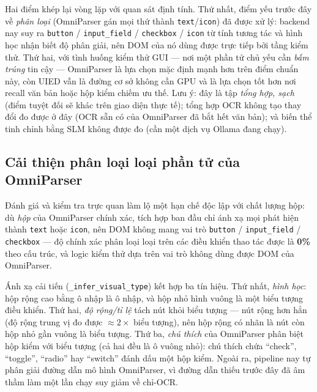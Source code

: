 \documentclass[11pt,a4paper]{article}
\newcommand{\code}[1]{\texttt{#1}}
\begin{document}
Hai điểm khép lại vòng lặp với quan sát định tính. Thứ nhất, điểm yếu trước đây về
\emph{phân loại} (OmniParser gán mọi thứ thành \code{text}/\code{icon}) đã được xử lý:
backend nay suy ra \code{button} / \code{input\_field} / \code{checkbox} /
\code{icon} từ tính tương tác và hình học nhận biết độ phân giải, nên DOM của nó dùng
được trực tiếp bởi tầng kiểm thử. Thứ hai, với tình huống kiểm thử GUI --- nơi một
phần tử chủ yếu cần \emph{bấm trúng} tin cậy --- OmniParser là lựa chọn mặc định mạnh
hơn trên điểm chuẩn này, còn UIED vẫn là đường cơ sở không cần GPU và là lựa chọn tốt
hơn nơi recall văn bản hoặc hộp kiểm chiếm ưu thế. Lưu ý: đây là tập \emph{tổng hợp,
sạch} (điểm tuyệt đối sẽ khác trên giao diện thực tế); tổng hợp OCR không tạo thay đổi
đo được ở đây (OCR sẵn có của OmniParser đã bắt hết văn bản); và biến thể tinh chỉnh
bằng SLM không được đo (cần một dịch vụ Ollama đang chạy).

\subsection{Cải thiện phân loại loại phần tử của OmniParser}
Đánh giá và kiểm tra trực quan làm lộ một hạn chế độc lập với chất lượng hộp: dù
\emph{hộp} của OmniParser chính xác, tích hợp ban đầu chỉ ánh xạ mọi phát hiện thành
\code{text} hoặc \code{icon}, nên DOM không mang vai trò \code{button} /
\code{input\_field} / \code{checkbox} --- độ chính xác phân loại loại trên các điều
khiển thao tác được là \textbf{0\%} theo cấu trúc, và logic kiểm thử dựa trên vai trò
không dùng được DOM của OmniParser.

Ánh xạ cải tiến (\code{\_infer\_visual\_type}) kết hợp ba tín hiệu. Thứ nhất,
\emph{hình học}: hộp rộng cao bằng ô nhập là ô nhập, và hộp nhỏ hình vuông là một
biểu tượng điều khiển. Thứ hai, \emph{độ rộng/tỉ lệ} tách nút khỏi biểu tượng --- nút
rộng hơn hẳn (độ rộng trung vị đo được $\approx 2\times$ biểu tượng), nên hộp rộng có
nhãn là nút còn hộp nhỏ gần vuông là biểu tượng. Thứ ba, \emph{chú thích} của
OmniParser phân biệt hộp kiểm với biểu tượng (cả hai đều là ô vuông nhỏ): chú thích
chứa ``check'', ``toggle'', ``radio'' hay ``switch'' đánh dấu một hộp kiểm. Ngoài ra,
pipeline nay tự phân giải đường dẫn mô hình OmniParser, vì đường dẫn thiếu trước đây
đã âm thầm làm một lần chạy suy giảm về chỉ-OCR.
\end{document}
